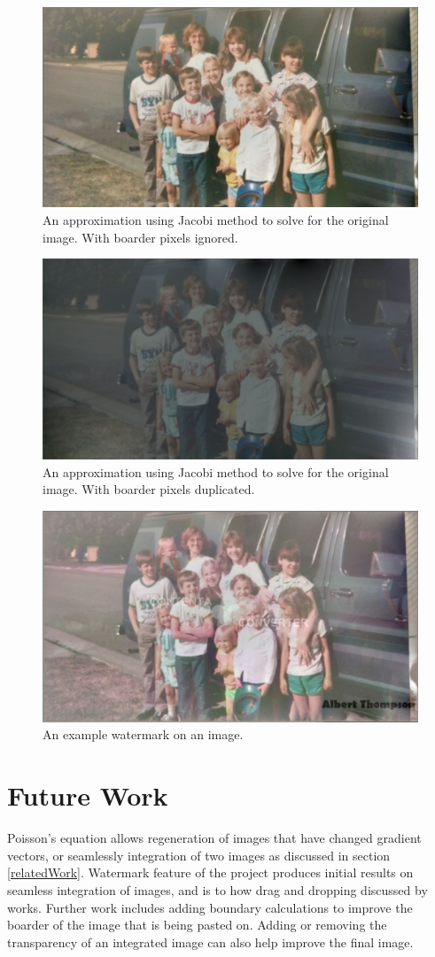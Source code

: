 \documentclass[10pt,twopage]{acmsiggraph}
\begin{document}
\begin{figure}
\centering
\includegraphics[width=.44\textwidth]{fig/familyResult.jpg}
\caption{An approximation using Jacobi method to solve for the original image. With boarder pixels ignored.}
\label{familyResult}
\end{figure}

\begin{figure}
\centering
\includegraphics[width=.44\textwidth]{fig/familyBoarder.jpg}
\caption{An approximation using Jacobi method to solve for the original image. With boarder pixels duplicated.}
\label{familyBoarder}
\end{figure}

\begin{figure}
\centering
\includegraphics[width=.44\textwidth]{fig/mask.jpg}
\caption{An example watermark on an image.}
\label{mask}
\end{figure}

\section{Future Work}

Poisson's equation allows regeneration of images that have changed gradient vectors, or seamlessly integration of two images as discussed in section \ref{relatedWork}. Watermark feature of the project produces initial results on seamless integration of images, and is to how drag and dropping discussed by \cite{ddp} works. Further work includes adding boundary calculations to improve the boarder of the image that is being pasted on. Adding or removing the transparency of an integrated image can also help improve the final image. 
\end{document}
